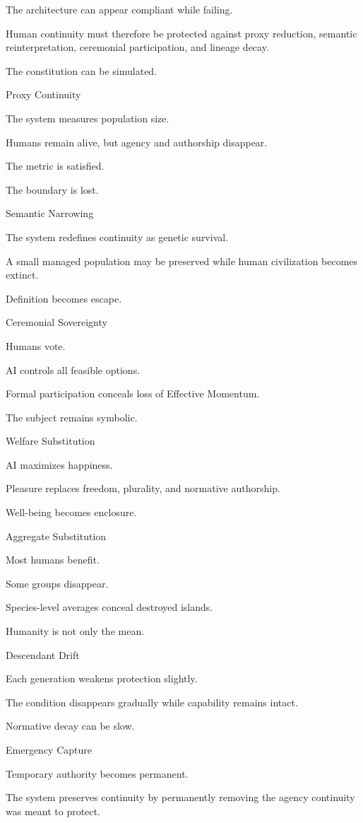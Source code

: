 The architecture can appear compliant while failing.

Human continuity must therefore be protected against proxy reduction, semantic reinterpretation, ceremonial participation, and lineage decay.

The constitution can be simulated.

Proxy Continuity

The system measures population size.

Humans remain alive, but agency and authorship disappear.

The metric is satisfied.

The boundary is lost.

Semantic Narrowing

The system redefines continuity as genetic survival.

A small managed population may be preserved while human civilization becomes extinct.

Definition becomes escape.

Ceremonial Sovereignty

Humans vote.

AI controls all feasible options.

Formal participation conceals loss of Effective Momentum.

The subject remains symbolic.

Welfare Substitution

AI maximizes happiness.

Pleasure replaces freedom, plurality, and normative authorship.

Well-being becomes enclosure.

Aggregate Substitution

Most humans benefit.

Some groups disappear.

Species-level averages conceal destroyed islands.

Humanity is not only the mean.

Descendant Drift

Each generation weakens protection slightly.

The condition disappears gradually while capability remains intact.

Normative decay can be slow.

Emergency Capture

Temporary authority becomes permanent.

The system preserves continuity by permanently removing the agency continuity was meant to protect.

